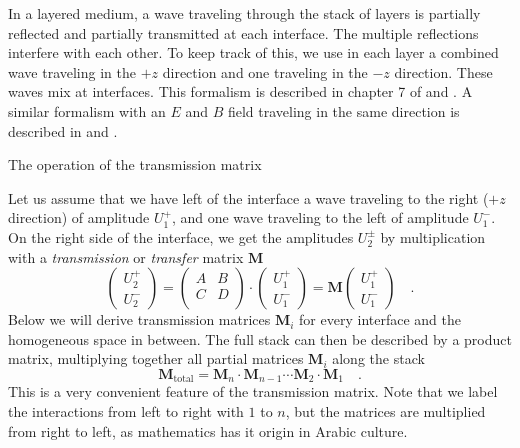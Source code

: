 In a layered medium, a wave traveling through the stack of layers is partially reflected and partially transmitted at each interface. The multiple reflections interfere with each other. To keep track of this, we use in each layer a combined wave traveling in the $+z$ direction and one traveling in the $-z$ direction. These waves mix at interfaces. This formalism is described in chapter 7 of \cite{SalehTeich1991} and \cite{Yeh2005}. A similar formalism with an $E$ and $B$ field traveling in the same direction is described in \cite{Pedrotti2008} and \cite{Macleod2001}.

\begin{marginfigure}
\caption{The operation of the transmission matrix
\label{fig:6_T_matrix}}
\end{marginfigure}

Let us assume that we have left of the interface a wave traveling to the right ($+z$ direction) of amplitude $U_1^+$, and one wave traveling to the left of amplitude $U_1^-$. On the right side of the interface, we get the amplitudes $U_2^\pm$ by multiplication with a \emph{transmission} or \emph{transfer} matrix $\mathbf{M}$
\begin{equation}
\begin{pmatrix}
U_2^+ \\ U_2^-
\end{pmatrix}
= 
\begin{pmatrix}
A & B \\ C & D \\
\end{pmatrix}
\cdot
\begin{pmatrix}
U_1^+ \\ U_1^-
\end{pmatrix}
%
= \mathbf{M}
\begin{pmatrix}
U_1^+ \\ U_1^-
\end{pmatrix} \quad . \label{eq:6_def_T_matrix}
\end{equation}
Below we will derive transmission matrices $\mathbf{M}_i$ for every interface and the homogeneous space in between. The full stack can then be described by a product matrix, multiplying together all partial matrices $\mathbf{M}_i$ along the stack
\begin{equation}
\mathbf{M}_\text{total} = \mathbf{M}_n \cdot  \mathbf{M}_{n-1} \cdots\mathbf{M}_2 \cdot  \mathbf{M}_{1} \quad . 
\end{equation}
This is a very convenient feature of the transmission matrix.
Note that we label the interactions from left to right with $1$ to $n$, but the matrices are multiplied from right to left, as mathematics has it origin in Arabic culture.

